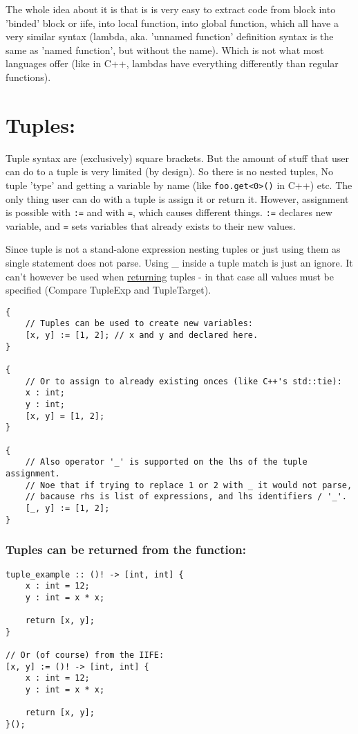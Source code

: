 \documentclass[11pt]{article}
\begin{document}
The whole idea about it is that is is very easy to extract code from block
into 'binded' block or iife, into local function, into global function,
which all have a very similar syntax (lambda, aka. 'unnamed function'
definition syntax is the same as 'named function', but without the
name). Which is not what most languages offer (like in C++, lambdas have
everything differently than regular functions).

\section*{Tuples:}
\label{sec:orga910013}

Tuple syntax are (exclusively) square brackets. But the amount of stuff that
user can do to a tuple is very limited (by design). So there is no nested
tuples, No tuple 'type' and getting a variable by name (like
\texttt{foo.get<0>()} in C++) etc.  The only thing user can do with a tuple is
assign it or return it. However, assignment is possible with \texttt{:=} and
with \texttt{=}, which causes different things. \texttt{:=} declares new
variable, and \texttt{=} sets variables that already exists to their new
values.

Since tuple is not a stand-alone expression nesting tuples or just using them
as single statement does not parse. Using \_ inside a tuple match is just an
ignore. It can't however be used when \uline{returning} tuples - in that case all
values must be specified (Compare TupleExp and TupleTarget).

\begin{verbatim}
{
    // Tuples can be used to create new variables:
    [x, y] := [1, 2]; // x and y and declared here.
}

{
    // Or to assign to already existing onces (like C++'s std::tie):
    x : int;
    y : int;
    [x, y] = [1, 2];
}

{
    // Also operator '_' is supported on the lhs of the tuple assignment.
    // Noe that if trying to replace 1 or 2 with _ it would not parse,
    // bacause rhs is list of expressions, and lhs identifiers / '_'.
    [_, y] := [1, 2];
}
\end{verbatim}

\subsubsection*{Tuples can be returned from the function:}
\label{sec:org1ee0f15}
\begin{verbatim}
tuple_example :: ()! -> [int, int] {
    x : int = 12;
    y : int = x * x;

    return [x, y];
}

// Or (of course) from the IIFE:
[x, y] := ()! -> [int, int] {
    x : int = 12;
    y : int = x * x;

    return [x, y];
}();
\end{verbatim}
\end{document}
